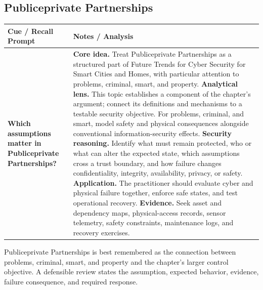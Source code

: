 \documentclass[11pt]{article}
\newcommand{\CornellHeader}{%
\rowcolor{Navy}\color{white}\bfseries Cue / Recall Prompt & \color{white}\bfseries Notes / Analysis\\\hline}
\newcommand{\CornellRow}[2]{%
\cellcolor{CueGray}\RaggedRight\textbf{#1} & \RaggedRight #2\\\hline}
\begin{document}
\subsection*{Publiceprivate Partnerships}
\begin{longtable}{>{\RaggedRight\arraybackslash}p{}|>{\RaggedRight\arraybackslash}p{}}
\CornellHeader
\CornellRow{Which assumptions matter in Publiceprivate Partnerships?}{\textbf{Core idea.} Treat Publiceprivate Partnerships as a structured part of Future Trends for Cyber Security for Smart Cities and Homes, with particular attention to problems, criminal, smart, and property. \textbf{Analytical lens.} This topic establishes a component of the chapter's argument; connect its definitions and mechanisms to a testable security objective. For problems, criminal, and smart, model safety and physical consequences alongside conventional information-security effects. \textbf{Security reasoning.} Identify what must remain protected, who or what can alter the expected state, which assumptions cross a trust boundary, and how failure changes confidentiality, integrity, availability, privacy, or safety. \textbf{Application.} The practitioner should evaluate cyber and physical failure together, enforce safe states, and test operational recovery. \textbf{Evidence.} Seek asset and dependency maps, physical-access records, sensor telemetry, safety constraints, maintenance logs, and recovery exercises.}
\end{longtable}
\begin{topicsummary}
Publiceprivate Partnerships is best remembered as the connection between problems, criminal, smart, and property and the chapter's larger control objective. A defensible review states the assumption, expected behavior, evidence, failure consequence, and required response.
\end{topicsummary}
\end{document}
